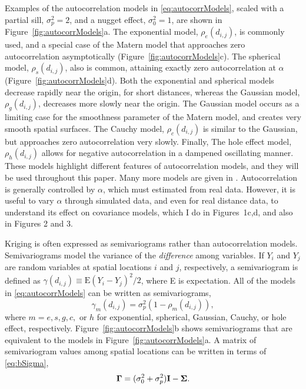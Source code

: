 \documentclass[11pt, titlepage]{article}\usepackage[]{graphicx}\usepackage[]{color}
\begin{document}
\begin{spacing}{1.9}
\begin{flushleft}
Examples of the autocorrelation models in \ref{eq:autocorrModels}, scaled with a partial sill, $\sigma^2_p = 2$, and a nugget effect, $\sigma^2_0 = 1$, are shown in Figure~\ref{fig:autocorrModels}a.  The exponential model, $\rho_e(d_{i,j})$, is commonly used, and a special case of the Matern model that approaches zero autocorrelation asymptotically (Figure~\ref{fig:autocorrModels}c). The spherical model, $\rho_s(d_{i,j})$, also is common, attaining exactly zero autocorrelation at $\alpha$ (Figure~\ref{fig:autocorrModels}d).  Both the exponential and spherical models decrease rapidly near the origin, for short distances, whereas the Gaussian model, $\rho_g(d_{i,j})$, decreases more slowly near the origin. The Gaussian model occurs as a limiting case for the smoothness parameter of the Matern model, and creates very smooth spatial surfaces. The Cauchy model, $\rho_c(d_{i,j})$ is similar to the Gaussian, but approaches zero autocorrelation very slowly. Finally, The hole effect model, $\rho_h(d_{i,j})$ allows for negative autocorrelation in a dampened oscillating manner. These models highlight different features of autocorrelation models, and they will be used throughout this paper. Many more models are given in \citet[][p. 80--93]{Chil:Delf:geos:1999}.  Autocorrelation is generally controlled by $\alpha$, which must estimated from real data.  However, it is useful to vary $\alpha$ through simulated data, and even for real distance data, to understand its effect on covariance models, which I do in Figures~1c,d, and also in Figures 2 and 3.

Kriging is often expressed as semivariograms rather than autocorrelation models.  Semivariograms model the variance of the \emph{difference} among variables. If $Y_i$ and $Y_j$ are random variables at spatial locations $i$ and $j$, respectively, a semivariogram is defined as $\gamma(d_{i,j}) \equiv \textrm{E}(Y_i - Y_j)^2/2$, where E is expectation.  All of the models in \ref{eq:autocorrModels} can be written as semivariograms,
\begin{equation} \label{eq:semivarrho}
				\gamma_m(d_{i,j}) = \sigma^2_p(1 - \rho_m(d_{i,j})),
\end{equation}
where $m = e, s, g, c,$ or $h$ for exponential, spherical, Gaussian, Cauchy, or hole effect, respectively. Figure~\ref{fig:autocorrModels}b shows semivariograms that are equivalent to the models in Figure~\ref{fig:autocorrModels}a.  A matrix of semivariogram values among spatial locations can be written in terms of \ref{eq:bSigma},
\[
\mbox{\boldmath $\Gamma$} = (\sigma_0^2 + \sigma^2_p)\mathbf{I} - \mbox{\boldmath $\Sigma$}.
\]


\end{flushleft}
\end{spacing}
\end{document}
